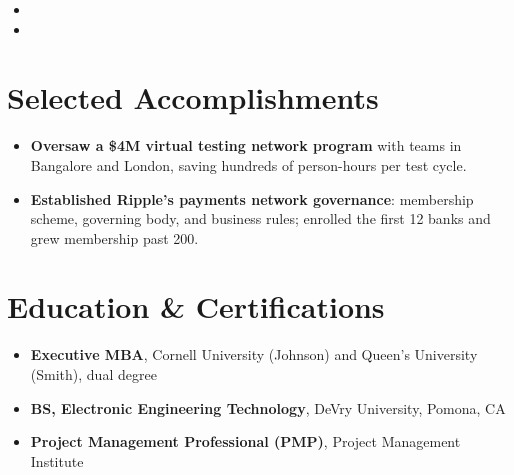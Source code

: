 \documentclass[11pt,letterpaper,sans]{moderncv}
\begin{document}
\begin{itemize}
\vspace{3pt}

\item{}

\vspace{3pt}

\item{}

\end{itemize}


\section{Selected Accomplishments}
\vspace{1pt}
\begin{itemize}
\item {\textbf{Oversaw a \$4M virtual testing network program} with teams in Bangalore and London, saving hundreds of person-hours per test cycle.}
\item {\textbf{Established Ripple's payments network governance}: membership scheme, governing body, and business rules; enrolled the first 12 banks and grew membership past 200.}
\end{itemize}


\section{Education \& Certifications}
\vspace{1pt}
\begin{itemize}
\item{\textbf{Executive MBA}, Cornell University (Johnson) and Queen's University (Smith), dual degree}
\item{\textbf{BS, Electronic Engineering Technology}, DeVry University, Pomona, CA}
\item{\textbf{Project Management Professional (PMP)}, Project Management Institute}
\end{itemize}
\end{document}
